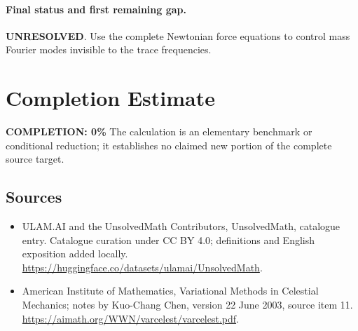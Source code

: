 \documentclass[11pt]{article}
\begin{document}
\paragraph{Final status and first remaining gap.}
\textbf{UNRESOLVED}. Use the complete Newtonian force equations to control mass Fourier modes invisible to the trace frequencies.

\section{Completion Estimate}
\noindent\textbf{COMPLETION: 0\%}
The calculation is an elementary benchmark or conditional reduction; it establishes no claimed new portion of the complete source target.

\subsection{Sources}
\begin{itemize}
\item[\hypertarget{source:statement:1}{S1}] ULAM.AI and the UnsolvedMath Contributors, UnsolvedMath, catalogue entry. Catalogue curation under CC BY 4.0; definitions and English exposition added locally.
\url{https://huggingface.co/datasets/ulamai/UnsolvedMath}.
\item[\hypertarget{source:statement:2}{S2}] American Institute of Mathematics, Variational Methods in Celestial Mechanics; notes by Kuo-Chang Chen, version 22 June 2003, source item 11.
\url{https://aimath.org/WWN/varcelest/varcelest.pdf}.
\end{itemize}
\label{end:statement}
\end{document}
